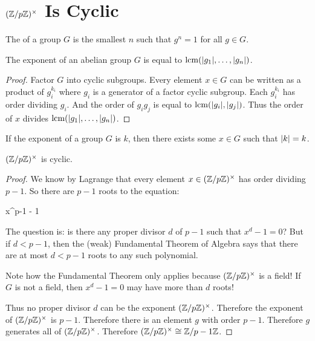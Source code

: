 \section{$\mathopen{}\left( {\mathbb{Z} / p\mathbb{Z}} \right)\mathclose{}^\times$ Is Cyclic}

\begin{definition}
  The  of a group $G$ is the smallest $n$ such that
  $g^n = 1$ for all $g \in G$.
\end{definition}

\begin{proposition}
  The exponent of an abelian group $G$ is equal to $\operatorname{lcm}\mathopen{}\left( {|g_1|,
  \ldots, |g_n|} \right)\mathclose{}$.
\end{proposition}

\begin{proof}
  Factor $G$ into cyclic subgroups. Every element $x \in G$ can be
  written as a product of $g_i^{k_i}$  where $g_i$ is a generator of a
  factor cyclic subgroup. Each $g_i^{k_i}$ has order dividing $g_i$. And
  the order of $g_i g_j$ is equal to $\operatorname{lcm}\mathopen{}\left( {|g_i|, |g_j|} \right)\mathclose{}$.
  Thus the order of $x$ divides $\operatorname{lcm}\mathopen{}\left( {|g_1|, \ldots,
  |g_n|} \right)\mathclose{}$.
\end{proof}

\begin{corollary}
  If the exponent of a group $G$ is $k$, then there exists some $x\in G$
  such that $|k| = k$.
\end{corollary}

\begin{theorem}
  $\mathopen{}\left( {\mathbb{Z} / p\mathbb{Z}} \right)\mathclose{}^\times$ is cyclic.
\end{theorem}

\begin{proof}
  We know by Lagrange that every element $x \in \mathopen{}\left( {\mathbb{Z} / p\mathbb{Z}} \right)\mathclose{}^\times$ has order
  dividing $p-1$. So there are $p-1$ roots to the equation:

  \begin{nedqn}
    x^{p-1} - 1
  \end{nedqn}

  The question is: is there any proper divisor $d$ of $p-1$ such that
  $x^d - 1 = 0$? But if $d < p-1$, then the (weak) Fundamental Theorem
  of Algebra says that there are at most $d < p-1$ roots to any such
  polynomial.

  Note how the Fundamental Theorem only applies because $\mathopen{}\left( {\mathbb{Z} / p\mathbb{Z}} \right)\mathclose{}^\times$ is a
  field! If $G$ is not a field, then $x^d - 1 = 0$ may have more than
  $d$ roots!

  Thus no proper divisor $d$ can be the exponent $\mathopen{}\left( {\mathbb{Z} / p\mathbb{Z}} \right)\mathclose{}^\times$. Therefore
  the exponent of $\mathopen{}\left( {\mathbb{Z} / p\mathbb{Z}} \right)\mathclose{}^\times$ is $p-1$. Therefore there is an element $g$
  with order $p-1$. Therefore $g$ generates all of $\mathopen{}\left( {\mathbb{Z} / p\mathbb{Z}} \right)\mathclose{}^\times$. Therefore
  $\mathopen{}\left( {\mathbb{Z} / p\mathbb{Z}} \right)\mathclose{}^\times \cong \mathbb{Z} / p-1\mathbb{Z}$.
\end{proof}

